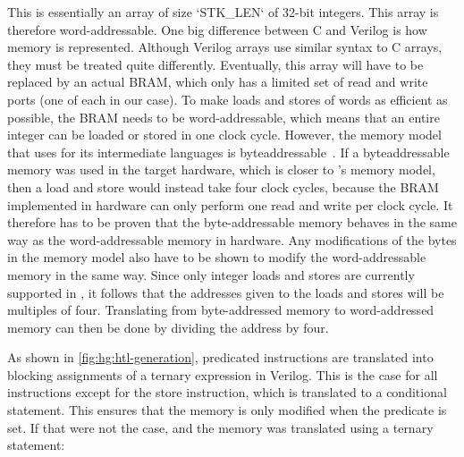 This is essentially an array of size \veriloginline`STK_LEN` of 32-bit integers.
This array is therefore word-addressable.  One big difference between C and
Verilog is how memory is represented.  Although Verilog arrays use similar
syntax to C arrays, they must be treated quite differently.  Eventually, this
array will have to be replaced by an actual \gls{BRAM}, which only has a limited
set of read and write ports (one of each in our case).  To make loads and stores
of words as efficient as possible, the \gls{BRAM} needs to be word-addressable,
which means that an entire integer can be loaded or stored in one clock cycle.
However, the memory model that \compcert{} uses for its intermediate languages
is byte\?addressable~\cite{blazy05_formal_verif_memor_model_c}.  If a
byte\?addressable memory was used in the target hardware, which is closer to
\compcert{}'s memory model, then a load and store would instead take four clock
cycles, because the \gls{BRAM} implemented in hardware can only perform one read
and write per clock cycle.  It therefore has to be proven that the
byte-addressable memory behaves in the same way as the word-addressable memory
in hardware.  Any modifications of the bytes in the \compcert{} memory model
also have to be shown to modify the word-addressable memory in the same way.
Since only integer loads and stores are currently supported in \vericert{}, it
follows that the addresses given to the loads and stores will be multiples of
four.  Translating from byte-addressed memory to word-addressed memory can then
be done by dividing the address by four.

As shown in \cref{fig:hg:htl-generation}, predicated instructions are translated
into blocking assignments of a ternary expression in Verilog.  This is the case
for all instructions except for the store instruction, which is translated to a
conditional statement.  This ensures that the memory is only modified when the
predicate is set.  If that were not the case, and the memory was translated
using a ternary statement:

\begin{center}
\end{center}

